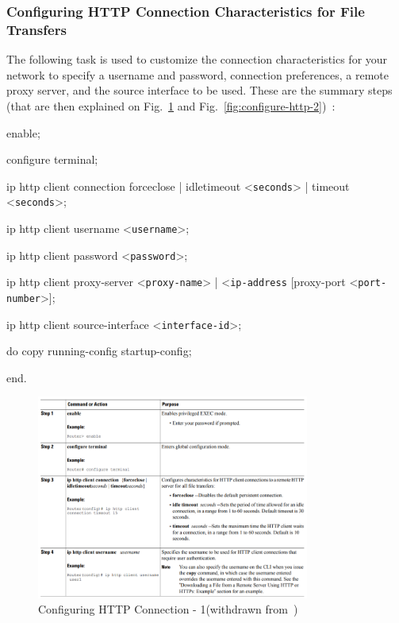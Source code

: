 \subsubsection{Configuring HTTP Connection Characteristics for File Transfers}
The following task is used to customize the connection characteristics for your network to specify a username and password, connection preferences, a remote proxy server, and the source interface to be used. These are the summary steps (that are then explained on Fig.~\ref{fig:configure-http-1} and Fig.~\ref{fig:configure-http-2})~\cite{http-example-cisco}:
%
\begin{enum-c}
\item enable;
\item configure terminal;
\item ip http client connection {forceclose | idletimeout <\texttt{seconds}> | timeout <\texttt{seconds}>};
\item ip http client username <\texttt{username}>;
\item ip http client password <\texttt{password}>;
\item ip http client proxy-server {<\texttt{proxy-name}> | <\texttt{ip-address}} [proxy-port <\texttt{port-number}>];
\item ip http client source-interface <\texttt{interface-id}>;
\item do copy running-config startup-config;
\item end.
\end{enum-c}
%
\begin{figure}[!hbt]
\centering
    \includegraphics[width=0.8\textwidth]{./img/configure-http-1.png}
  \caption{Configuring HTTP Connection - 1(withdrawn from~\cite{http-example-cisco})}%
\label{fig:configure-http-1}
\end{figure}
